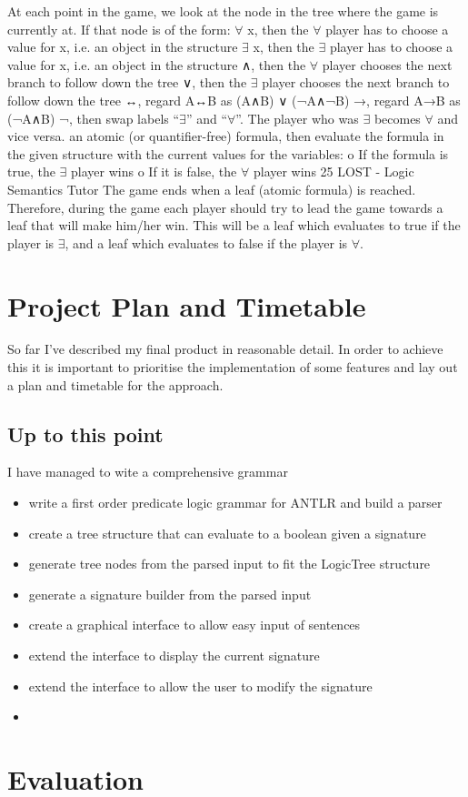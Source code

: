\documentclass{article}
\begin{document}
At each point in the game, we look at
the node in the tree where the game is currently at. If that node is of the form:
$\forall$ x, then the $\forall$ player has to choose a value for x, i.e. an object in the structure
$\exists$ x, then the $\exists$ player has to choose a value for x, i.e. an object in the structure
∧, then the $\forall$ player chooses the next branch to follow down the tree
∨, then the $\exists$ player chooses the next branch to follow down the tree
↔, regard A↔B as (A∧B) ∨ (¬A∧¬B)
→, regard A→B as (¬A∧B)
¬, then swap labels “$\exists$” and “$\forall$”. The player who was $\exists$ becomes $\forall$ and vice versa.
an atomic (or quantifier-free) formula, then evaluate the formula in the given structure
with the current values for the variables:
o If the formula is true, the $\exists$ player wins
o If it is false, the $\forall$ player wins
25
LOST - Logic Semantics Tutor
The game ends when a leaf (atomic formula) is reached. Therefore, during the game each
player should try to lead the game towards a leaf that will make him/her win. This will be
a leaf which evaluates to true if the player is $\exists$, and a leaf which evaluates to false if the
player is $\forall$.




\section{Project Plan and Timetable}		%
So far I've described my final product in reasonable detail. In order to achieve this it is important to prioritise the implementation of some features and lay out a plan and timetable for the approach.

	\subsection{Up to this point}
	I have managed to wite a comprehensive grammar

	\begin{itemize}
	\item{write a first order predicate logic grammar for ANTLR and build a parser}
	\item{create a tree structure that can evaluate to a boolean given a signature}
	\item{generate tree nodes from the parsed input to fit the LogicTree structure}
	\item{generate a signature builder from the parsed input}
	\item{create a graphical interface to allow easy input of sentences}
	\item{extend the interface to display the current signature}
	\item{extend the interface to allow the user to modify the signature}
	\item
	\end{itemize}

\section{Evaluation}		%
\end{document}
